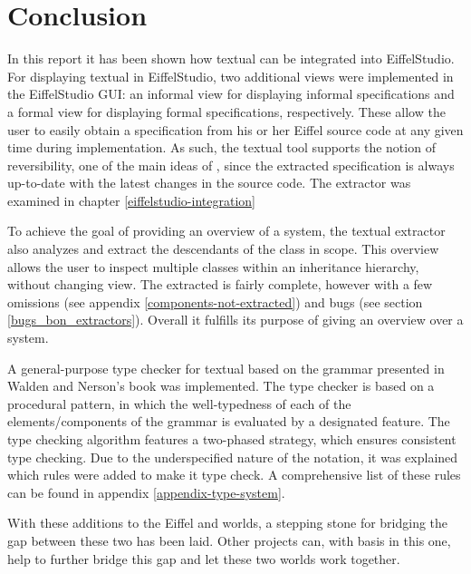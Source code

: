 \chapter{Conclusion} 
In this report it has been shown how textual \bon{} can be integrated into EiffelStudio. For displaying textual \bon{} in EiffelStudio, two additional views were implemented in the EiffelStudio GUI: an informal \bon{} view for displaying informal specifications and a formal \bon{} view for displaying formal specifications, respectively. These allow the user to easily obtain a \bon{} specification from his or her Eiffel source code at any given time during implementation. As such, the textual \bon{} tool supports the notion of reversibility, one of the main ideas of \bon{}, since the extracted specification is always up-to-date with the latest changes in the source code. The extractor was examined in chapter \ref{eiffelstudio-integration}

To achieve the goal of providing an overview of a system, the textual \bon{} extractor also analyzes and extract the descendants of the class in scope. This overview allows the user to inspect multiple classes within an inheritance hierarchy, without changing view. The extracted \bon{} is fairly complete, however with a few omissions (see appendix \ref{components-not-extracted}) and bugs (see section \ref{bugs_bon_extractors}). Overall it fulfills its purpose of giving an overview over a system.

A general-purpose type checker for textual \bon{} based on the grammar presented in Walden and Nerson's book was implemented. The type checker is based on a procedural pattern, in which the well-typedness of each of the elements/components of the grammar is evaluated by a designated feature. The type checking algorithm features a two-phased strategy, which ensures consistent type checking. Due to the underspecified nature of the notation, it was explained which rules were added to make it type check. A comprehensive list of these rules can be found in appendix \ref{appendix-type-system}. 

With these additions to the Eiffel and \bon{} worlds, a stepping stone for bridging the gap between these two has been laid. Other projects can, with basis in this one, help to further bridge this gap and let these two worlds work together.